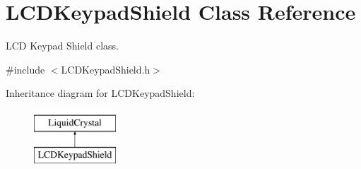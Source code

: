 \hypertarget{class_l_c_d_keypad_shield}{}\section{L\+C\+D\+Keypad\+Shield Class Reference}
\label{class_l_c_d_keypad_shield}


L\+CD Keypad Shield class.  




{\ttfamily \#include $<$L\+C\+D\+Keypad\+Shield.\+h$>$}

Inheritance diagram for L\+C\+D\+Keypad\+Shield\+:\begin{figure}[H]
\begin{center}
\leavevmode
\includegraphics[height=2.000000cm]{class_l_c_d_keypad_shield}
\end{center}
\end{figure}
